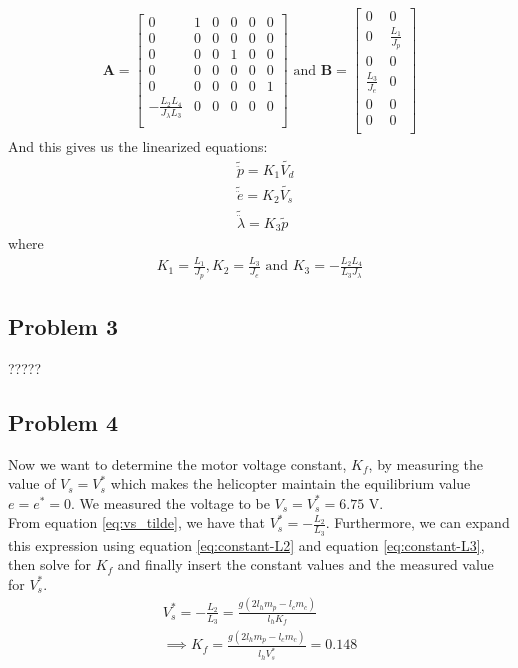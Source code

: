 \begin{gather}
    \mathbf{A} = 
    \begin{bmatrix}
        0 & 1 & 0 & 0 & 0 & 0 \\
        0 & 0 & 0 & 0 & 0 & 0 \\
        0 & 0 & 0 & 1 & 0 & 0 \\
        0 & 0 & 0 & 0 & 0 & 0 \\
        0 & 0 & 0 & 0 & 0 & 1 \\
        -\frac{L_2 L_4}{J_\lambda L_3} & 0 & 0 & 0 & 0 & 0 \\
    \end{bmatrix}
    \text{ and }
    \mathbf{B} =
    \begin{bmatrix}
        0 & 0 \\
        0 & \frac{L_1}{J_p} \\
        0 & 0 \\
        \frac{L_3}{J_e} & 0\\
        0 & 0 \\
        0 & 0 \\
    \end{bmatrix}
\end{gather}
And this gives us the linearized equations:
\begin{subequations} \label{eq:lin_model}
    \begin{align}
        &\tilde{\ddot{p}} = K_1 \tilde{V_d} \label{eq:lin_model_pitch}\\
        &\tilde{\ddot{e}} = K_2 \tilde{V_s} \label{eq:lin_model_elev}\\
        &\tilde{\ddot{\lambda}} = K_3 \tilde{p} \label{eq:lin_model_travel}
    \end{align}
\end{subequations}
where
\begin{gather}
    K_1 = \frac{L_1}{J_p}, K_2 = \frac{L_3}{J_e} \text{ and } K_3 = -\frac{L_2 L_4}{L_3 J_\lambda}
\end{gather}

\subsection{Problem 3}
?????

\subsection{Problem 4}
Now we want to determine the motor voltage constant, $K_f$, by measuring the value of $V_s = V_s^*$ which makes the helicopter maintain the equilibrium value $e = e^* = 0$. We measured the voltage to be $V_s = V_s^* = 6.75 \text{ V}$. 
\\From equation \eqref{eq:vs_tilde}, we have that $V_s^* = -\frac{L_2}{L_3}$. Furthermore, we can expand this expression using equation \eqref{eq:constant-L2} and equation \eqref{eq:constant-L3}, then solve for $K_f$ and finally insert the constant values and the measured value for $V_s^*$. 
\begin{gather}
    V_s^* = -\frac{L_2}{L_3} = \frac{g(2 l_h m_p - l_c m_c)}{l_h K_f}\nonumber\\
    \implies K_f = \frac{g(2 l_h m_p - l_c m_c)}{l_h V_s^*} = 0.148
\end{gather}